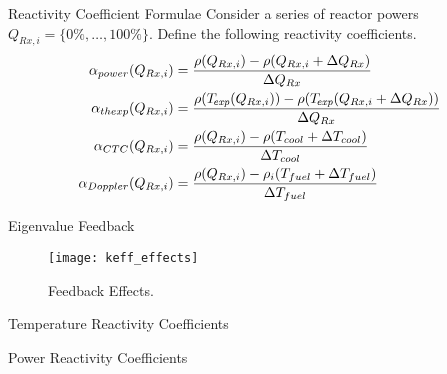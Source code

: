 \begin{frame}{Reactivity Coefficient Formulae}
  Consider a series of reactor powers $Q_{Rx,i} = \{0\%,\ldots,100\%\}$.
  Define the following reactivity coefficients.
  \begin{align}
    \label{eq:power_reactivity_coefficient}
    \alpha_{power}(Q_{Rx,i}) &= \frac{\rho(Q_{Rx,i}) - \rho(Q_{Rx,i} + 
      \Delta Q_{Rx})} {\Delta Q_{Rx}} \\
    \label{eq:thermal_expansion_reactivity_coefficient}
    \alpha_{thexp}(Q_{Rx,i}) &= \frac{\rho({T_{\!\mbox{\scriptsize \em exp}}}(Q_{Rx,i})) -
      \rho({T_{\!\mbox{\scriptsize \em exp}}}(Q_{Rx,i} + \Delta Q_{Rx}))}{\Delta Q_{Rx}} \\
    \label{eq:doppler_reactivity_coefficient}
    \alpha_{CTC}(Q_{Rx,i}) &= \frac{\rho(Q_{Rx,i}) - \rho(T_{cool} + 
      \Delta T_{cool})} {\Delta T_{cool}} \\
    \label{eq:coolant_temperature_reactivity_coefficient}
    \alpha_{Doppler}(Q_{Rx,i}) &= \frac{\rho(Q_{Rx,i}) - \rho_i(T_{fuel} + 
      \Delta T_{fuel})} {\Delta T_{fuel}}
  \end{align}
\end{frame}

\begin{frame}{Eigenvalue Feedback}
  \begin{figure}
    \centering
    \texttt{[image: keff\_effects]}
    \caption{\keff Feedback Effects.}
    \label{fig:keff_effects}
  \end{figure}
\end{frame}

\begin{frame}{Temperature Reactivity Coefficients}
  \begin{figure}
    \centering
  \end{figure}
\end{frame}

\begin{frame}{Power Reactivity Coefficients}
  \begin{figure}
    \centering
  \end{figure}
\end{frame}

